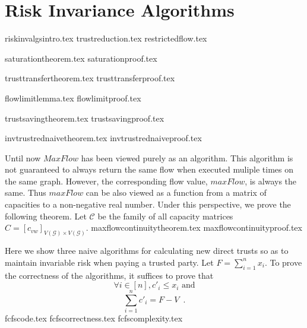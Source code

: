 \section{Risk Invariance Algorithms}
  {riskinvalgsintro.tex}
  {trustreduction.tex}
  {restrictedflow.tex}

  {saturationtheorem.tex}
  {saturationproof.tex}

  {trusttransfertheorem.tex}
  {trusttransferproof.tex}

  {flowlimitlemma.tex}
  {flowlimitproof.tex}

  {trustsavingtheorem.tex}
  {trustsavingproof.tex}

  {invtrustrednaivetheorem.tex}
  {invtrustrednaiveproof.tex}

  Until now $MaxFlow$ has been viewed purely as an algorithm. This algorithm is not guaranteed to always return the same
  flow when executed muliple times on the same graph. However, the corresponding flow value, $maxFlow$, is always the same.
  Thus $maxFlow$ can be also viewed as a function from a matrix of capacities to a non-negative real number. Under this
  perspective, we prove the following theorem. Let $\mathcal{C}$ be the family of all capacity matrices
  $C = [c_{vw}]_{V\left(\mathcal{G}\right) \times V\left(\mathcal{G}\right)}$.
  {maxflowcontinuitytheorem.tex}
  {maxflowcontinuityproof.tex}

  Here we show three naive algorithms for calculating new direct trusts so as to maintain invariable risk when paying
  a trusted party. Let $F = \sum\limits_{i=1}^{n}x_i$. To prove the correctness of the algorithms, it suffices to prove that
  \begin{equation}
  \label{naive:req1}
     \forall i \in [n], c'_i \leq x_i \mbox{ and}
  \end{equation}
  \begin{equation}
  \label{naive:req2}
     \sum\limits_{i=1}^{n}c'_i = F - V \enspace.
  \end{equation}
  {fcfscode.tex}
  {fcfscorrectness.tex}
  {fcfscomplexity.tex}

